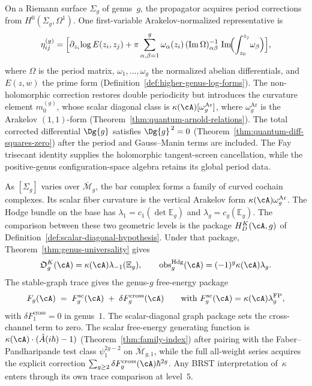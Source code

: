 On a Riemann surface $\Sigma_g$ of genus~$g$, the propagator acquires
period corrections from $H^0(\Sigma_g, \Omega^1)$.
One first-variable Arakelov-normalized representative is
\[
\eta_{ij}^{(g)} = \Bigl[\partial_{z_i}\!\log E(z_i, z_j)
 + \pi \sum_{\alpha,\beta=1}^{g}
 \omega_\alpha(z_i)\,(\operatorname{Im}\Omega)^{-1}_{\alpha\beta}\,
 \operatorname{Im}\!\Bigl(\int_{z_0}^{z_j}\!\omega_\beta\Bigr)
\Bigr],
\]
where $\Omega$ is the period matrix, $\omega_1,\ldots,\omega_g$ the
normalized abelian differentials, and $E(z,w)$ the prime form
(Definition~\ref{def:higher-genus-log-forms}).
The non-holomorphic correction restores double periodicity but
introduces the curvature element $m_0^{(g)}$, whose scalar diagonal
class is $\kappa(\cA)[\omega_g^{\mathrm{Ar}}]$, where
$\omega_g^{\mathrm{Ar}}$ is the Arakelov $(1,1)$-form
(Theorem~\ref{thm:quantum-arnold-relations}). The total corrected
differential $\Dg{g}$ satisfies $\Dg{g}^{\,2} = 0$
(Theorem~\ref{thm:quantum-diff-squares-zero}) after the period and
Gauss--Manin terms are included. The Fay trisecant identity supplies
the holomorphic tangent-screen cancellation, while the positive-genus
configuration-space algebra retains its global period data.

As $[\Sigma_g]$ varies over $\overline{\mathcal{M}}_g$, the bar
complex forms a family of curved cochain complexes.  Its scalar
fiber curvature is the vertical Arakelov form
$\kappa(\cA)\omega_g^{\mathrm{Ar}}$.  The Hodge bundle on the base
has $\lambda_1=c_1(\det\mathbb E_g)$ and
$\lambda_g=c_g(\mathbb E_g)$.  The comparison between these two
geometric levels is the package $H_D^K(\cA,g)$ of
Definition~\ref{def:scalar-diagonal-hypothesis}.  Under that package,
Theorem~\ref{thm:genus-universality} gives
\[
 \mathfrak O_g^K(\cA)=\kappa(\cA)\lambda_{-1}(\mathbb E_g),
 \qquad
 \operatorname{obs}^{\mathrm{Hdg}}_g(\cA)
 =(-1)^g\kappa(\cA)\lambda_g.
\]
The stable-graph trace gives the genus-$g$ free-energy package
\[
F_g(\cA)
\;=\;
F_g^{\mathrm{sc}}(\cA)
\;+\;
\delta F_g^{\mathrm{cross}}(\cA)
\qquad
\textup{with }F_g^{\mathrm{sc}}(\cA)
=\kappa(\cA)\lambda_g^{\mathrm{FP}},
\]
with $\delta F_1^{\mathrm{cross}}=0$ in genus~$1$.  The
scalar-diagonal graph package sets the cross-channel term to zero.
The scalar free-energy generating function is
$\kappa(\cA)\cdot(\hat{A}(i\hbar) - 1)$
\textup{(}Theorem~\textup{\ref{thm:family-index}}\textup{}) after
pairing with the Faber--Pandharipande test class
$\psi_1^{2g-2}$ on $\overline{\mathcal{M}}_{g,1}$, while
the full all-weight series acquires the explicit correction
$\sum_{g\ge2}\delta F_g^{\mathrm{cross}}(\cA)\hbar^{2g}$.
Any BRST interpretation of~$\kappa$ enters through its own trace
comparison at level~$5$.

